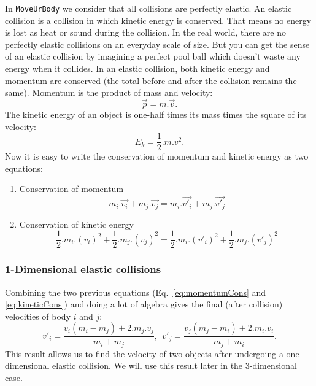 In \texttt{MoveUrBody} we consider that all collisions are perfectly elastic.
An elastic collision is a collision in which kinetic energy is conserved. 
That means no energy is lost as heat or sound during the collision. 
In the real world, there are no perfectly elastic collisions on an everyday scale of size. 
But you can get the sense of an elastic collision by imagining a perfect pool ball which doesn't waste any energy when it collides. 
In an elastic collision, both kinetic energy and momentum are conserved (the total before and after the collision remains the same).
Momentum is the product of mass and velocity: 
\begin{equation}	
\label{eq:momentum}
	\vec{p} = m . \vec{v}.
\end{equation}
The kinetic energy of an object is one-half times its mass times the square of its velocity:
\begin{equation}	
\label{eq:kinetic}
	E_k = \frac{1}{2} . m . v^2.
\end{equation}
Now it is easy to write the conservation of momentum and kinetic energy as two equations:
\begin{enumerate}
	\item Conservation of momentum
		\begin{equation}	
		\label{eq:momentumCons}
			m_i . \vec{v_i} + m_j . \vec{v_j} = m_i . \vec{v'_i} + m_j . \vec{v'_j}
		\end{equation}
		
	\item Conservation of kinetic energy
		\begin{equation}	
		\label{eq:kineticCons}
			\frac{1}{2} . m_i . (v_i)^2 + \frac{1}{2} . m_j . (v_j)^2 = \frac{1}{2} . m_i . (v'_i)^2 + \frac{1}{2} . m_j . (v'_j)^2
		\end{equation}
\end{enumerate}

\subsubsection{1-Dimensional elastic collisions}
Combining the two previous equations (Eq.~\ref{eq:momentumCons} and \ref{eq:kineticCons}) and doing a lot of algebra gives the final (after collision) velocities of body $i$ and $j$:
\begin{equation}	
	v'_i = \frac{v_i(m_i-m_j) + 2.m_j.v_j}{m_i + m_j},~~v'_j = \frac{v_j(m_j-m_i) + 2.m_i.v_i}{m_j + m_i}.
\end{equation}
This result allows us to find the velocity of two objects after undergoing a one-dimensional elastic collision. 
We will use this result later in the 3-dimensional case.

